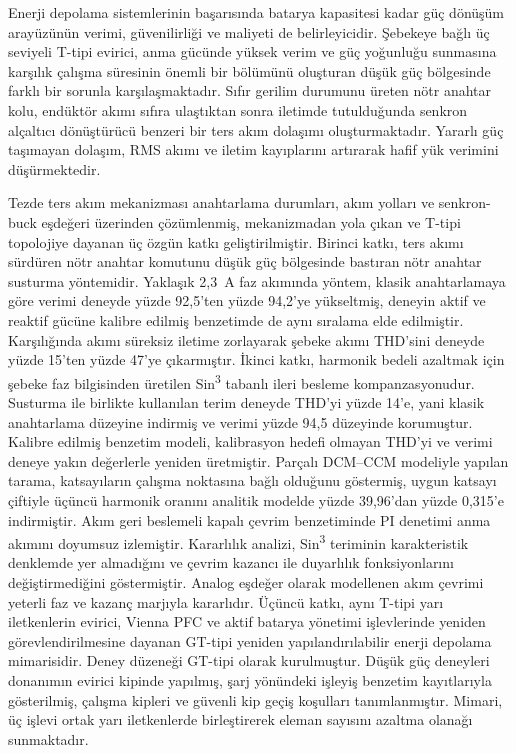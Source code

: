 \begin{ozet}
Enerji depolama sistemlerinin başarısında batarya kapasitesi kadar güç dönüşüm arayüzünün verimi, güvenilirliği ve maliyeti de belirleyicidir. Şebekeye bağlı üç seviyeli T-tipi evirici, anma gücünde yüksek verim ve güç yoğunluğu sunmasına karşılık çalışma süresinin önemli bir bölümünü oluşturan düşük güç bölgesinde farklı bir sorunla karşılaşmaktadır. Sıfır gerilim durumunu üreten nötr anahtar kolu, endüktör akımı sıfıra ulaştıktan sonra iletimde tutulduğunda senkron alçaltıcı dönüştürücü benzeri bir ters akım dolaşımı oluşturmaktadır. Yararlı güç taşımayan dolaşım, RMS akımı ve iletim kayıplarını artırarak hafif yük verimini düşürmektedir.

Tezde ters akım mekanizması anahtarlama durumları, akım yolları ve senkron-buck eşdeğeri üzerinden çözümlenmiş, mekanizmadan yola çıkan ve T-tipi topolojiye dayanan üç özgün katkı geliştirilmiştir. Birinci katkı, ters akımı sürdüren nötr anahtar komutunu düşük güç bölgesinde bastıran nötr anahtar susturma yöntemidir. Yaklaşık 2,3~A faz akımında yöntem, klasik anahtarlamaya göre verimi deneyde yüzde 92,5'ten yüzde 94,2'ye yükseltmiş, deneyin aktif ve reaktif gücüne kalibre edilmiş benzetimde de aynı sıralama elde edilmiştir. Karşılığında akımı süreksiz iletime zorlayarak şebeke akımı THD'sini deneyde yüzde 15'ten yüzde 47'ye çıkarmıştır. İkinci katkı, harmonik bedeli azaltmak için şebeke faz bilgisinden üretilen Sin\textsuperscript{3} tabanlı ileri besleme kompanzasyonudur. Susturma ile birlikte kullanılan terim deneyde THD'yi yüzde 14'e, yani klasik anahtarlama düzeyine indirmiş ve verimi yüzde 94,5 düzeyinde korumuştur. Kalibre edilmiş benzetim modeli, kalibrasyon hedefi olmayan THD'yi ve verimi deneye yakın değerlerle yeniden üretmiştir. Parçalı DCM--CCM modeliyle yapılan tarama, katsayıların çalışma noktasına bağlı olduğunu göstermiş, uygun katsayı çiftiyle üçüncü harmonik oranını analitik modelde yüzde 39,96'dan yüzde 0,315'e indirmiştir. Akım geri beslemeli kapalı çevrim benzetiminde PI denetimi anma akımını doyumsuz izlemiştir. Kararlılık analizi, Sin\textsuperscript{3} teriminin karakteristik denklemde yer almadığını ve çevrim kazancı ile duyarlılık fonksiyonlarını değiştirmediğini göstermiştir. Analog eşdeğer olarak modellenen akım çevrimi yeterli faz ve kazanç marjıyla kararlıdır. Üçüncü katkı, aynı T-tipi yarı iletkenlerin evirici, Vienna PFC ve aktif batarya yönetimi işlevlerinde yeniden görevlendirilmesine dayanan GT-tipi yeniden yapılandırılabilir enerji depolama mimarisidir. Deney düzeneği GT-tipi olarak kurulmuştur. Düşük güç deneyleri donanımın evirici kipinde yapılmış, şarj yönündeki işleyiş benzetim kayıtlarıyla gösterilmiş, çalışma kipleri ve güvenli kip geçiş koşulları tanımlanmıştır. Mimari, üç işlevi ortak yarı iletkenlerde birleştirerek eleman sayısını azaltma olanağı sunmaktadır.


\end{ozet}
